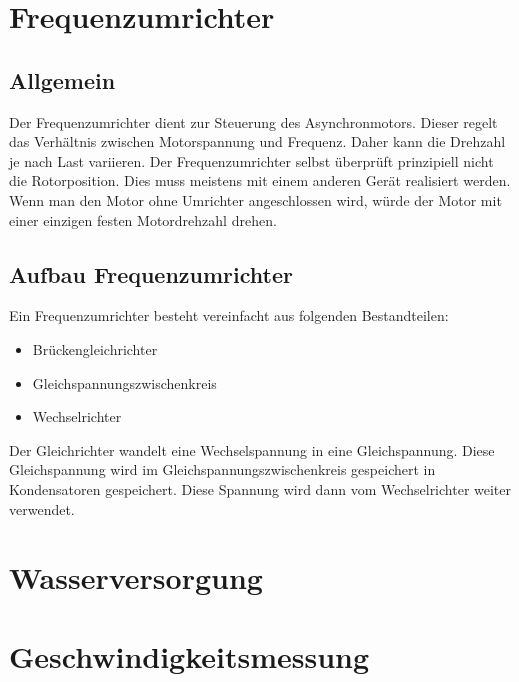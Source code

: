 \documentclass[12pt]{scrreprt} %
\begin{document}
\section{Frequenzumrichter}
\label{sec:frequenzumrichter}

\subsection{Allgemein}
\label{sec:allgemeinfrequenzumrichter}

Der Frequenzumrichter dient zur Steuerung des Asynchronmotors. Dieser regelt das Verhältnis zwischen Motorspannung und Frequenz. Daher kann die Drehzahl je  nach Last variieren. Der Frequenzumrichter selbst überprüft prinzipiell nicht die Rotorposition. Dies muss meistens mit einem anderen Gerät realisiert werden. Wenn man den Motor ohne Umrichter angeschlossen wird, würde der Motor mit einer einzigen festen Motordrehzahl drehen. 

\subsection{Aufbau Frequenzumrichter}
\label{sec:aufbauFrequenzumrichter}

Ein Frequenzumrichter besteht vereinfacht aus folgenden Bestandteilen:

\begin{itemize}
	\item{Brückengleichrichter}
	\item{Gleichspannungszwischenkreis}
	\item{Wechselrichter}
\end{itemize}

Der Gleichrichter wandelt eine Wechselspannung in eine Gleichspannung. Diese Gleichspannung wird im Gleichspannungszwischenkreis gespeichert in Kondensatoren gespeichert. Diese Spannung wird dann vom Wechselrichter weiter verwendet. 


\newpage
\section{Wasserversorgung}
\label{sec:wasserversorgung}



\newpage
\section{Geschwindigkeitsmessung}
\label{sec:geschwindigkeitsmessung}
\newpage
\end{document}
